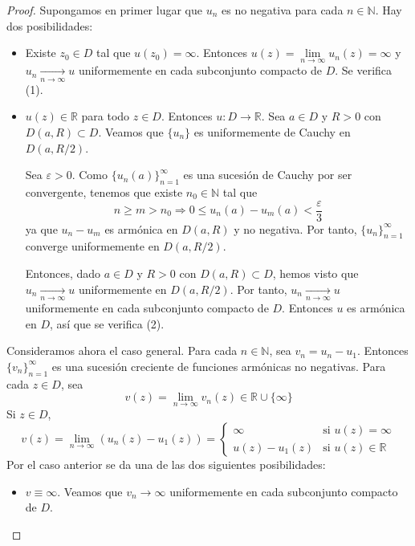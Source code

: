 \begin{proof}
    Supongamos en primer lugar que $u_n$ es no negativa para cada $n \in \mathbb{N}$.
    Hay dos posibilidades:
    \begin{itemize}
        \item Existe $z_0 \in D$ tal que $u(z_0) = \infty$.
              Entonces $u(z) = \lim\limits_{n \to \infty} u_n(z) = \infty$ y $u_n \xrightarrow[n \to \infty]{} u$ uniformemente en cada subconjunto compacto de $D$.
              Se verifica (1).

        \item $u(z) \in \mathbb{R}$ para todo $z \in D$.
              Entonces $u: D \to \mathbb{R}$.
              Sea $a \in D$ y $R > 0$ con $D(a, R) \subset D$.
              Veamos que $\{u_n\}$ es uniformemente de Cauchy en $D(a, R/2)$.

              Sea $\varepsilon > 0$.
              Como $\{u_n(a)\}_{n=1}^\infty$ es una sucesión de Cauchy por ser convergente, tenemos que existe $n_0 \in \mathbb{N}$ tal que
              $$n \geq m > n_0 \Rightarrow 0 \leq u_n(a)-u_m(a) < \frac{\varepsilon}{3}$$
              ya que $u_n-u_m$ es armónica en $D(a, R)$ y no negativa.
              Por tanto, $\{u_n\}_{n=1}^\infty$ converge uniformemente en $D(a, R/2)$.

              Entonces, dado $a \in D$ y $R > 0$ con $D(a, R) \subset D$, hemos visto que $u_n \xrightarrow[n \to \infty]{} u$ uniformemente en $D(a, R/2)$.
              Por tanto, $u_n \xrightarrow[n \to \infty]{} u$ uniformemente en cada subconjunto compacto de $D$.
              Entonces $u$ es armónica en $D$, así que se verifica (2).
    \end{itemize}

    Consideramos ahora el caso general.
    Para cada $n \in \mathbb{N}$, sea $v_n = u_n - u_1$.
    Entonces $\{v_n\}_{n=1}^\infty$ es una sucesión creciente de funciones armónicas no negativas.
    Para cada $z \in D$, sea
    $$v(z) = \lim\limits_{n \to \infty} v_n(z) \in \mathbb{R} \cup \{\infty\}$$
    Si $z \in D$,
    $$v(z) = \lim\limits_{n \to \infty} (u_n(z)-u_1(z)) = \begin{cases}
            \infty        & \text{si } u(z) = \infty       \\
            u(z) - u_1(z) & \text{si } u(z) \in \mathbb{R}
        \end{cases}$$
    Por el caso anterior se da una de las dos siguientes posibilidades:
    \begin{itemize}
        \item $v \equiv \infty$.
              Veamos que $v_n \to \infty$ uniformemente en cada subconjunto compacto de $D$.


\end{itemize}
\end{proof}
